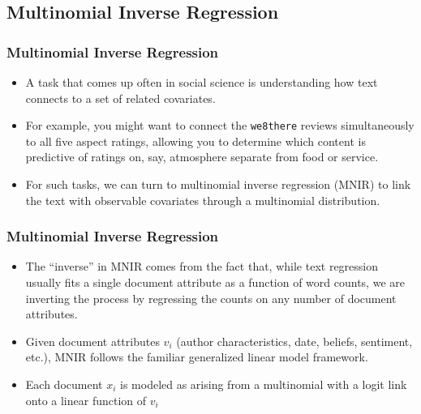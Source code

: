 \documentclass[
  shownotes,
  xcolor={svgnames},
  hyperref={colorlinks,citecolor=DarkBlue,linkcolor=DarkRed,urlcolor=DarkBlue}
  , aspectratio=169]{beamer}
\begin{document}
\subsection{Multinomial Inverse Regression}
\begin{frame}
\frametitle{Multinomial Inverse Regression}


\begin{itemize}

  \item A task that comes up often in social science is understanding how text connects to a set of related covariates. 
  \medskip
  \item For example, you might want to connect the \texttt{we8there} reviews simultaneously to all five aspect ratings, allowing you to determine which content is predictive of ratings on, say, atmosphere separate from food or service. 
  \medskip
  \item  For such tasks, we can turn to multinomial inverse regression (MNIR) to link the text with observable covariates through a multinomial distribution. 
\end{itemize}

\end{frame}
\begin{frame}
\frametitle{Multinomial Inverse Regression}


\begin{itemize}
  \item The  ``inverse'' in MNIR comes from the fact that, while text regression usually fits a single document attribute as a function of word counts, we are inverting the process by regressing the counts on any number of document attributes. 
  \medskip
  \item Given document attributes $v_i$ (author characteristics, date, beliefs, sentiment, etc.), MNIR follows the familiar generalized linear model framework. 
  \medskip
  \item Each document $x_i$ is modeled as arising from a multinomial with a logit link onto a linear function of $v_i$
\end{itemize}

\end{frame}
\end{document}
